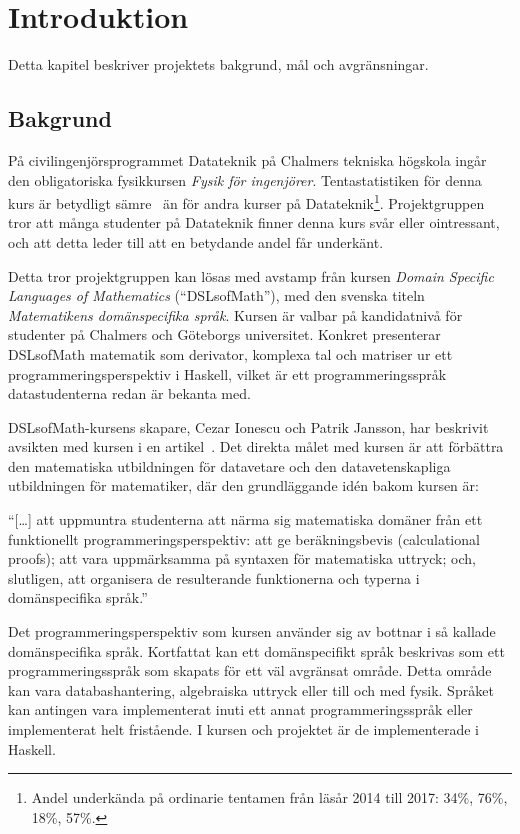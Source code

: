 
\chapter{Introduktion}

Detta kapitel beskriver projektets bakgrund, mål och avgränsningar.

\section{Bakgrund}

På civilingenjörsprogrammet Datateknik på Chalmers tekniska högskola ingår den obligatoriska
fysikkursen \textit{Fysik för ingenjörer}. Tentastatistiken för denna kurs är
betydligt sämre~\cite{tentastatistik} än för andra kurser på Datateknik\footnote{Andel underkända på
ordinarie tentamen från läsår 2014 till 2017: 34\%, 76\%, 18\%, 57\%.
}. Projektgruppen tror att många studenter på Datateknik finner denna
kurs svår eller ointressant, och att detta leder till att en betydande andel får
underkänt.

Detta tror projektgruppen kan lösas med avstamp från kursen \textit{Domain
Specific Languages of Mathematics} (``DSLsofMath''), med den svenska titeln
\textit{Matematikens domänspecifika språk}. Kursen är valbar på kandidatnivå för studenter på Chalmers och Göteborgs universitet. Konkret
presenterar DSLsofMath matematik som derivator, komplexa tal och
matriser ur ett programmeringsperspektiv i Haskell, vilket är ett programmeringsspråk datastudenterna redan är bekanta med.

DSLsofMath-kursens skapare, Cezar Ionescu och Patrik Jansson, har beskrivit avsikten med kursen i en artikel~\cite{tfpie2015}. Det direkta målet med kursen är
att förbättra den matematiska utbildningen för datavetare och den
datavetenskapliga utbildningen för matematiker, där den grundläggande idén
bakom kursen är:

\begin{center} ``[\dots] att uppmuntra studenterna att närma sig matematiska
  domäner från ett funktionellt programmeringsperspektiv: att ge beräkningsbevis
  (calculational proofs); att vara uppmärksamma på syntaxen för matematiska
  uttryck; och, slutligen, att organisera de resulterande funktionerna och
typerna i domänspecifika språk.''~\cite{tfpie2015}~\cite{lecture-notes}\
\end{center}

Det programmeringsperspektiv som kursen använder sig av bottnar i
så kallade domänspecifika språk. Kortfattat kan ett domänspecifikt språk
beskrivas som ett programmeringsspråk som skapats för ett väl avgränsat
område. Detta område kan vara databashantering, algebraiska uttryck eller till
och med fysik. Språket kan antingen vara implementerat inuti ett annat
programmeringsspråk eller implementerat helt fristående. I kursen och projektet
är de implementerade i Haskell.

